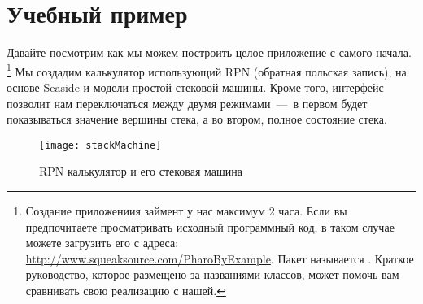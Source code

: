 \documentclass[a4paper,10pt,twoside]{book}
\begin{document}

\section{Учебный пример}



Давайте посмотрим как мы можем построить целое приложение
с самого начала.
\footnote{Создание приложениия займент у нас максимум 2 часа.
Если вы предпочитаете просматривать исходный программный код,
в таком случае можете загрузить его с адреса:
\url{http://www.squeaksource.com/PharoByExample}.
Пакет называется .
Краткое руководство, которое размещено за названиями классов,
может помочь вам сравнивать свою реализацию с нашей.}
Мы создадим калькулятор использующий RPN (обратная польская запись),
на основе Seaside и модели простой стековой машины.
Кроме того, интерфейс позволит нам переключаться между
двумя режимами \,---\, в первом будет показываться значение
вершины стека, а во втором, полное состояние стека.

\begin{figure}[ht]
\begin{center}
\texttt{[image: stackMachine]}
\caption{RPN калькулятор и его стековая машина}
\end{center}
\end{figure}
\end{document}
